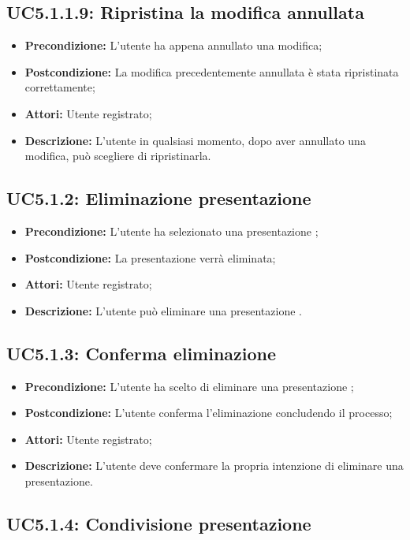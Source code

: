 \subsection{ UC5.1.1.9: Ripristina la modifica annullata}

\begin{itemize}
	\item \textbf{Precondizione:} L’utente ha appena annullato una modifica;
	\item \textbf{Postcondizione:} La modifica precedentemente annullata è stata ripristinata correttamente;
	\item \textbf{Attori:} Utente registrato;
	\item \textbf{Descrizione:} L’utente in qualsiasi momento, dopo aver annullato una modifica, può scegliere di ripristinarla.
\end{itemize}
\subsection{ UC5.1.2: Eliminazione presentazione}

\begin{itemize}
	\item \textbf{Precondizione:} L'utente ha selezionato una presentazione ;
	\item \textbf{Postcondizione:} La presentazione verrà eliminata;
	\item \textbf{Attori:} Utente registrato;
	\item \textbf{Descrizione:} L'utente può eliminare una presentazione .
\end{itemize}
\subsection{ UC5.1.3: Conferma eliminazione }

\begin{itemize}
	\item \textbf{Precondizione:} L'utente ha scelto di eliminare una presentazione ;
	\item \textbf{Postcondizione:} L'utente conferma l'eliminazione concludendo il processo;
	\item \textbf{Attori:} Utente registrato;
	\item \textbf{Descrizione:} L'utente deve confermare la propria intenzione di eliminare una presentazione.
\end{itemize}
\subsection{ UC5.1.4: Condivisione presentazione }

